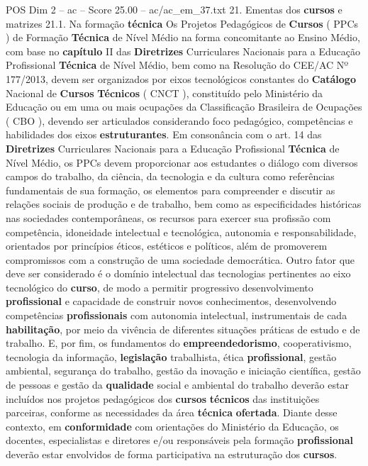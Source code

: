 \begin{textsample}{POS Dim 2 – ac – Score 25.00 – ac/ac\_em\_37.txt}  \label{ex:f2_pos_165}
21.
Ementas dos \textbf{cursos} e matrizes 21.1.
Na formação \textbf{técnica} Os Projetos Pedagógicos de \textbf{Cursos} ( PPCs ) de Formação \textbf{Técnica} de Nível Médio na forma concomitante ao Ensino Médio, com base no \textbf{capítulo} II das \textbf{Diretrizes} Curriculares Nacionais para a Educação Profissional \textbf{Técnica} de Nível Médio, bem como na Resolução do CEE/AC Nº 177/2013, devem ser organizados por eixos tecnológicos constantes do \textbf{Catálogo} Nacional de \textbf{Cursos} \textbf{Técnicos} ( CNCT ), constituído pelo Ministério da Educação ou em uma ou mais ocupações da Classificação Brasileira de Ocupações ( CBO ), devendo ser articulados considerando foco pedagógico, competências e habilidades dos eixos \textbf{estruturantes}.
Em consonância com o art. 14 das \textbf{Diretrizes} Curriculares Nacionais para a Educação Profissional \textbf{Técnica} de Nível Médio, os PPCs devem proporcionar aos estudantes o diálogo com diversos campos do trabalho, da ciência, da tecnologia e da cultura como referências fundamentais de sua formação, os elementos para compreender e discutir as relações sociais de produção e de trabalho, bem como as especificidades históricas nas sociedades contemporâneas, os recursos para exercer sua profissão com competência, idoneidade intelectual e tecnológica, autonomia e responsabilidade, orientados por princípios éticos, estéticos e políticos, além de promoverem compromissos com a construção de uma sociedade democrática.
Outro fator que deve ser considerado é o domínio intelectual das tecnologias pertinentes ao eixo tecnológico do \textbf{curso}, de modo a permitir progressivo desenvolvimento \textbf{profissional} e capacidade de construir novos conhecimentos, desenvolvendo competências \textbf{profissionais} com autonomia intelectual, instrumentais de cada \textbf{habilitação}, por meio da vivência de diferentes situações práticas de estudo e de trabalho.
E, por fim, os fundamentos do \textbf{empreendedorismo}, cooperativismo, tecnologia da informação, \textbf{legislação} trabalhista, ética \textbf{profissional}, gestão ambiental, segurança do trabalho, gestão da inovação e iniciação científica, gestão de pessoas e gestão da \textbf{qualidade} social e ambiental do trabalho deverão estar incluídos nos projetos pedagógicos dos \textbf{cursos} \textbf{técnicos} das instituições parceiras, conforme as necessidades da área \textbf{técnica} \textbf{ofertada}.
Diante desse contexto, em \textbf{conformidade} com orientações do Ministério da Educação, os docentes, especialistas e diretores e/ou responsáveis pela formação \textbf{profissional} deverão estar envolvidos de forma participativa na estruturação dos \textbf{cursos}.

\end{textsample}
